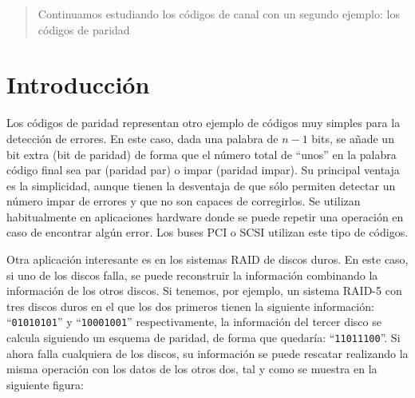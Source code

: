 \documentclass[es,practica]{uah}
\begin{document}

\maketitle

\begin{abstract}
	Continuamos estudiando los códigos de canal con un segundo ejemplo: los códigos de paridad
\end{abstract}

\section{Introducción}

Los códigos de paridad representan otro ejemplo de códigos muy simples para la detección de errores. En este caso, dada una palabra de $n-1$ bits, se añade un bit extra (bit de paridad) de forma que el número total de ``unos'' en la palabra código final sea par (paridad par)
 o impar (paridad impar). Su principal ventaja es la simplicidad, aunque tienen la desventaja de que sólo permiten detectar un número impar de errores y que no son capaces de corregirlos. Se utilizan habitualmente en aplicaciones hardware donde se puede repetir una operación en caso de encontrar algún error. Los buses PCI o SCSI utilizan este tipo de códigos.
 
 Otra aplicación interesante es en los sistemas RAID de discos duros. En este caso, si uno de los discos falla, se puede reconstruir la información combinando la información de los otros discos. Si tenemos, por ejemplo, un sistema RAID-5 con tres discos duros en el que los dos primeros tienen la siguiente información: ``\texttt{01010101}'' y ``\texttt{10001001}'' respectivamente, la información del tercer disco se calcula siguiendo un esquema de paridad, de forma que quedaría: ``\texttt{11011100}''. Si ahora falla cualquiera de los discos, su información se puede rescatar realizando la misma operación con los datos de los otros dos, tal y como se muestra en la siguiente figura:
\end{document}
